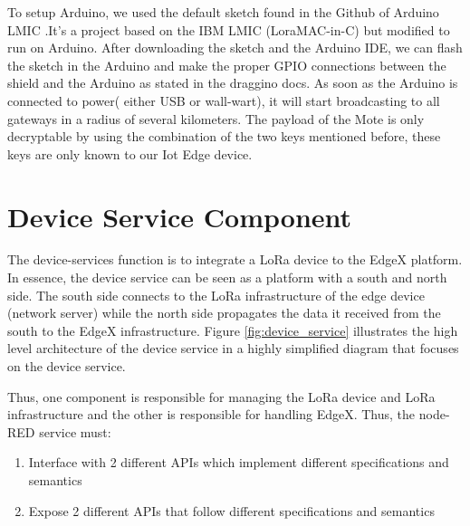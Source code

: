 To setup Arduino, we used the default sketch found in the Github of Arduino LMIC \cite{Arduino-lmic} .It’s a project based on the IBM LMIC (LoraMAC-in-C) but modified to run on Arduino. After downloading the sketch and the Arduino IDE, we can flash the sketch in the Arduino and make the proper GPIO connections between the shield and the Arduino as stated in the draggino docs\cite{dragino}. As soon as the Arduino is connected to power( either USB or wall-wart), it will start broadcasting to all gateways in a radius of several kilometers. The payload of the Mote is only decryptable by using the combination of the two keys mentioned before, these keys are only known to our Iot Edge device.

\section{Device Service Component}
The device-services function is to integrate a LoRa device to the EdgeX platform. In essence, the device service can be seen as a platform with a south and north side. The south side connects to the LoRa infrastructure of the edge device (network server) while the north side propagates the data it received from the south to the EdgeX infrastructure. Figure \ref{fig:device_service} illustrates the high level architecture of the device service in a highly simplified diagram that focuses on the device service.

Thus, one component is responsible for managing the LoRa device and LoRa infrastructure and the other is responsible for handling EdgeX. Thus, the node-RED service must:
\begin{enumerate}
    \item Interface with 2 different APIs which implement different specifications and semantics
    \item Expose 2 different APIs that follow different specifications and semantics

\end{enumerate}

